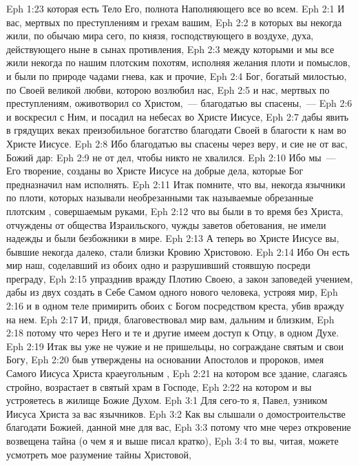 \vs Eph 1:23 которая есть Тело Его, полнота Наполняющего все во всем.
\vs Eph 2:1 И вас, мертвых по преступлениям и грехам вашим,
\vs Eph 2:2 в которых вы некогда жили, по обычаю мира сего, по  князя, господствующего в воздухе, духа, действующего ныне в сынах противления,
\vs Eph 2:3 между которыми и мы все жили некогда по нашим плотским похотям, исполняя желания плоти и помыслов, и были по природе чадами гнева, как и прочие,
\vs Eph 2:4 Бог, богатый милостью, по Своей великой любви, которою возлюбил нас,
\vs Eph 2:5 и нас, мертвых по преступлениям, оживотворил со Христом,~--- благодатью вы спасены,~---
\vs Eph 2:6 и воскресил с Ним, и посадил на небесах во Христе Иисусе,
\vs Eph 2:7 дабы явить в грядущих веках преизобильное богатство благодати Своей в благости к нам во Христе Иисусе.
\vs Eph 2:8 Ибо благодатью вы спасены через веру, и сие не от вас, Божий дар:
\vs Eph 2:9 не от дел, чтобы никто не хвалился.
\vs Eph 2:10 Ибо мы~--- Его творение, созданы во Христе Иисусе на добрые дела, которые Бог предназначил нам исполнять.
\rsbpar\vs Eph 2:11 Итак помните, что вы, некогда язычники по плоти, которых называли необрезанными так называемые обрезанные плотским , совершаемым руками,
\vs Eph 2:12 что вы были в то время без Христа, отчуждены от общества Израильского, чужды заветов обетования, не имели надежды и были безбожники в мире.
\vs Eph 2:13 А теперь во Христе Иисусе вы, бывшие некогда далеко, стали близки Кровию Христовою.
\vs Eph 2:14 Ибо Он есть мир наш, соделавший из обоих одно и разрушивший стоявшую посреди преграду,
\vs Eph 2:15 упразднив вражду Плотию Своею, а закон заповедей учением, дабы из двух создать в Себе Самом одного нового человека, устрояя мир,
\vs Eph 2:16 и в одном теле примирить обоих с Богом посредством креста, убив вражду на нем.
\vs Eph 2:17 И, придя, благовествовал мир вам, дальним и близким,
\vs Eph 2:18 потому что через Него и те и другие имеем доступ к Отцу, в одном Духе.
\rsbpar\vs Eph 2:19 Итак вы уже не чужие и не пришельцы, но сограждане святым и свои Богу,
\vs Eph 2:20 быв утверждены на основании Апостолов и пророков, имея Самого Иисуса Христа краеугольным ,
\vs Eph 2:21 на котором все здание, слагаясь стройно, возрастает в святый храм в Господе,
\vs Eph 2:22 на котором и вы устрояетесь в жилище Божие Духом.
\vs Eph 3:1 Для сего-то я, Павел,  узником Иисуса Христа за вас язычников.
\vs Eph 3:2 Как вы слышали о домостроительстве благодати Божией, данной мне для вас,
\vs Eph 3:3 потому что мне через откровение возвещена тайна (о чем я и выше писал кратко),
\vs Eph 3:4 то вы, читая, можете усмотреть мое разумение тайны Христовой,
